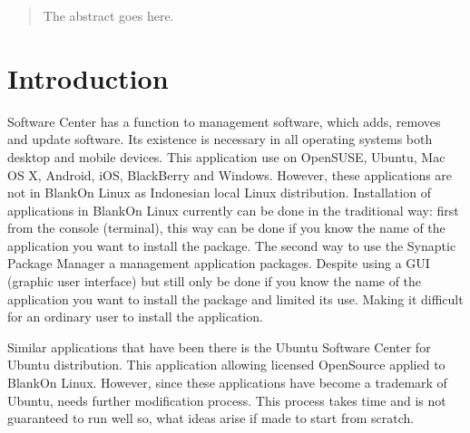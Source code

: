 \documentclass[conference, letterpaper]{IEEEtran}
\begin{document}
\begin{abstract}
The abstract goes here.
\end{abstract}



%
\IEEEpeerreviewmaketitle

\section{Introduction}
Software Center has a function to management software, which adds, removes and update software. Its existence is necessary in all operating systems both desktop and mobile devices. This application use on OpenSUSE, Ubuntu, Mac OS X, Android, iOS, BlackBerry and Windows. However, these applications are not in BlankOn Linux as Indonesian local Linux distribution. Installation of applications in BlankOn Linux currently can be done in the traditional way: first from the console (terminal), this way can be done if you know the name of the application you want to install the package. The second way to use the Synaptic Package Manager a management application packages. Despite using a GUI (graphic user interface) but still only be done if you know the name of the application you want to install the package and limited its use. Making it difficult for an ordinary user to install the application.

Similar applications that have been there is the Ubuntu Software Center for Ubuntu distribution. This application allowing licensed OpenSource applied to BlankOn Linux. However, since these applications have become a trademark of Ubuntu, needs further modification process. This process takes time and is not guaranteed to run well so, what ideas arise if made ​​to start from scratch.
\end{document}
